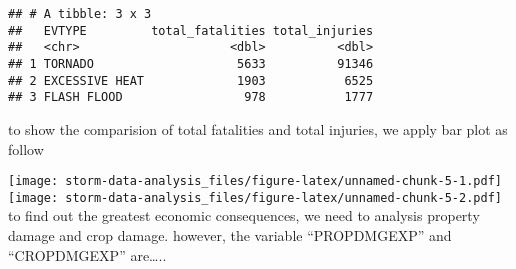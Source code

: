 \documentclass[
]{article}
\begin{document}
\begin{verbatim}
## # A tibble: 3 x 3
##   EVTYPE         total_fatalities total_injuries
##   <chr>                     <dbl>          <dbl>
## 1 TORNADO                    5633          91346
## 2 EXCESSIVE HEAT             1903           6525
## 3 FLASH FLOOD                 978           1777
\end{verbatim}

to show the comparision of total fatalities and total injuries, we apply
bar plot as follow

\texttt{[image: storm-data-analysis\_files/figure-latex/unnamed-chunk-5-1.pdf]}
\texttt{[image: storm-data-analysis\_files/figure-latex/unnamed-chunk-5-2.pdf]}
to find out the greatest economic consequences, we need to analysis
property damage and crop damage. however, the variable ``PROPDMGEXP''
and ``CROPDMGEXP'' are\ldots..
\end{document}
